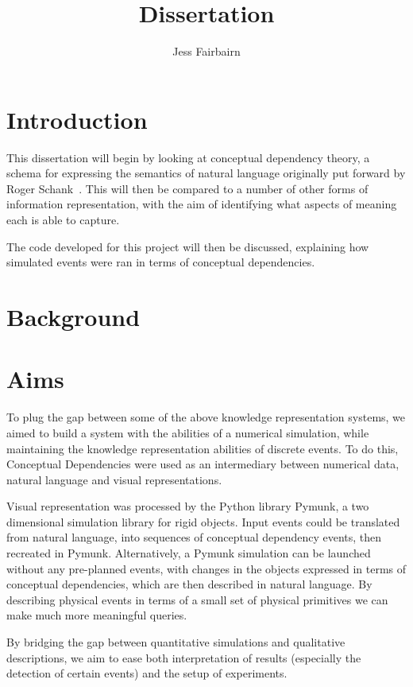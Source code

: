\documentclass{article}
\author{Jess Fairbairn}
\title{Dissertation}
\begin{document}
    \maketitle
    \tableofcontents
    \section{Introduction}
    This dissertation will begin by looking at conceptual dependency theory, a schema for expressing the semantics of natural language originally put forward by Roger Schank~\cite{SCHANK1972552}. This will then be compared to a number of other forms of information representation, with the aim of identifying what aspects of meaning each is able to capture.

    The code developed for this project will then be discussed, explaining how simulated events were ran in terms of conceptual dependencies. 

    \section{Background}
    
    

    \section{Aims}
    To plug the gap between some of the above knowledge representation systems, we aimed to build a system with the abilities of a numerical simulation, while maintaining the knowledge representation abilities of discrete events. To do this, Conceptual Dependencies were used as an intermediary between numerical data, natural language and visual representations.

    Visual representation was processed by the Python library Pymunk, a two dimensional simulation library for rigid objects. Input events could be translated from natural language, into sequences of conceptual dependency events, then recreated in Pymunk. Alternatively, a Pymunk simulation can be launched without any pre-planned events, with changes in the objects expressed in terms of conceptual dependencies, which are then described in natural language. By describing physical events in terms of a small set of physical primitives we can make much more meaningful queries.

    By bridging the gap between quantitative simulations and qualitative descriptions, we aim to ease both interpretation of results (especially the detection of certain events) and the setup of experiments.
\end{document}
